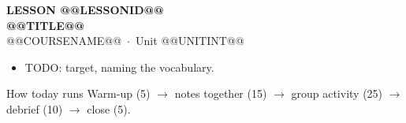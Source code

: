 \documentclass[aspectratio=169, 11pt]{beamer}
\begin{document}
{
\begin{frame}[plain]
  \vspace{2.8cm}\hspace{0.55cm}%
  \begin{minipage}{0.9\textwidth}
    {\color{goldacc}\bfseries\small LESSON @@LESSONID@@}\\[0.5cm]
    {\color{white}\bfseries\LARGE @@TITLE@@}\\[1.2cm]
    {\color{forestmid}\small @@COURSENAME@@~$\cdot$~Unit @@UNITINT@@}
  \end{minipage}
\end{frame}
}


\begin{frame}[t, plain]
  \begin{itemize}\setlength{\itemsep}{6pt}
    \item TODO: target, naming the vocabulary.
  \end{itemize}
  \vspace{4pt}
  \begin{block}{How today runs}
    Warm-up (5) $\to$ notes together (15) $\to$ group activity (25) $\to$ debrief (10) $\to$ close (5).
  \end{block}
\end{frame}

\begin{frame}[t, plain]
\end{frame}

\begin{frame}[t, plain]
\end{frame}

\begin{frame}[t, plain]
\end{frame}
\end{document}
